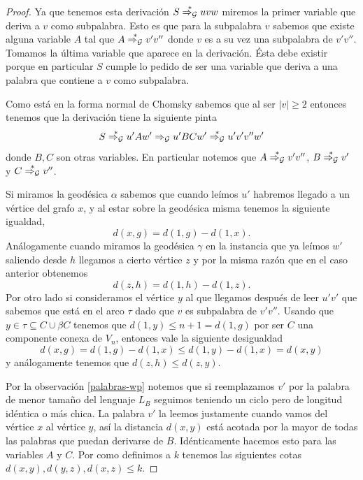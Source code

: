 \documentclass[tesis.tex]{subfiles}
\newcommand{\deriva}{\overset{*}{\Rightarrow_{\cal G}}}
\begin{document}
\begin{proof}
Ya que tenemos esta derivación $S \deriva uvw$ miremos la primer variable que deriva a $v$ como subpalabra. 
Esto es que para la subpalabra $v$ sabemos que existe alguna variable $A$ tal que $A \deriva v'v''$ donde $v$ es a su vez una subpalabra de $v'v''$. 
Tomamos la última variable que aparece en la derivación.
Ésta debe existir porque en particular $S$ cumple lo pedido de ser una variable que deriva a una palabra que contiene a $v$ como subpalabra.

Como está en la forma normal de Chomsky sabemos que al ser $|v| \ge 2$ entonces tenemos que la derivación tiene la siguiente pinta
\begin{equation*}
	S \deriva u'Aw' \Rightarrow_{\cal G} u'BC w' \deriva u'v'v''w'
\end{equation*}
donde $B,C$ son otras variables. En particular notemos que $A \deriva v'v''$, $B \deriva v'$ y $C \deriva v''$.


Si miramos la geodésica $\alpha$ sabemos que cuando leímos $u'$ habremos llegado a un vértice del grafo $x$, y al estar sobre la geodésica misma tenemos la siguiente igualdad,
\begin{equation*}
d(x,g) = d(1,g) - d(1,x).
\end{equation*}
Análogamente cuando miramos la geodésica $\gamma$ en la instancia que ya leímos $w'$ saliendo desde $h$ llegamos a cierto vértice $z$ y por la misma razón que en el caso anterior obtenemos
\begin{equation*}
	d(z,h) = d(1,h) - d(1,z).
\end{equation*}
Por otro lado si consideramos el vértice $y$ al que llegamos después de leer $u'v'$ que sabemos que está en el arco $\tau$ dado que $v$ es subpalabra de $v'v''$.
Usando que $y \in \tau \subseteq C \cup \beta C$ tenemos que $d(1,y) \le n+1 = d(1,g)$ por ser $C$ una componente conexa de $V_n$, entonces vale la siguiente desigualdad
\begin{equation*}
d(x,g) = d(1,g) - d(1,x) \le d(1,y) - d(1,x) = d(x,y)
\end{equation*}
y análogamente tenemos que $d(z,h) \le d(z,y)$.


Por la observación \ref{palabras-wp} notemos que si reemplazamos $v'$ por la palabra de menor tamaño del lenguaje $L_B$ seguimos teniendo un ciclo pero de longitud idéntica o más chica. 
La palabra $v'$ la leemos justamente cuando vamos del vértice $x$ al vértice $y$, así la distancia  $d(x,y)$ está acotada por la mayor de todas las palabras que puedan derivarse de $B$. 
Idénticamente hacemos esto para las variables $A$ y $C$.
Por como definimos a $k$ tenemos las siguientes cotas $d(x,y), d(y,z), d(x,z) \le k$.


\end{proof}
\end{document}
